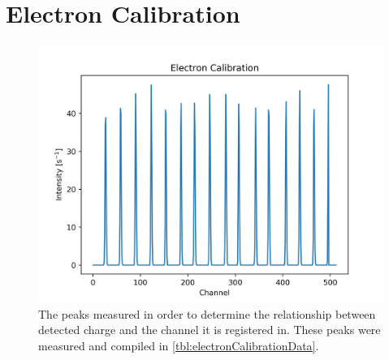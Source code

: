 \documentclass[a4paper, twoside, 11pt]{report}
\begin{document}








\clearpage
{}
{}
\printbibliography


\clearpage
{}
\appendix
{}

\chapter{Electron Calibration}

\begin{figure}[h]
  \centering
  \includegraphics[width=\linewidth]{electronCalibrationData.png}
  \caption{The peaks measured in order to determine the relationship between detected charge and the channel it is registered in. These peaks were measured and compiled in \ref{tbl:electronCalibrationData}.}
  \label{fig:electronCalibrationData}
\end{figure}
\end{document}
